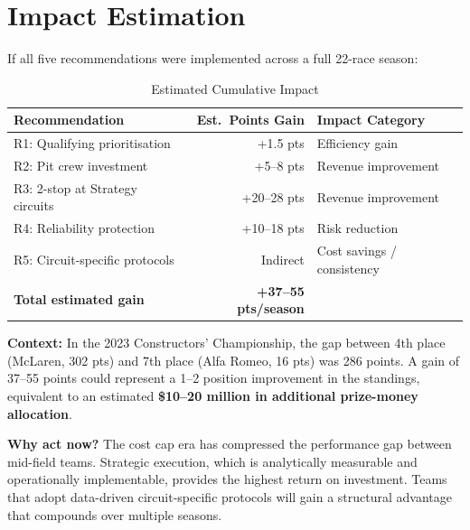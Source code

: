 \documentclass[12pt, a4paper]{article}
\begin{document}
\newpage

\section{Impact Estimation}

If all five recommendations were implemented across a full 22-race season:

\begin{table}[H]
\centering
\caption{Estimated Cumulative Impact}
\begin{tabular}{l r l}
\toprule
\textbf{Recommendation} & \textbf{Est.\ Points Gain} & \textbf{Impact Category} \\
\midrule
R1: Qualifying prioritisation    & +1.5 pts   & Efficiency gain \\
R2: Pit crew investment          & +5--8 pts  & Revenue improvement \\
R3: 2-stop at Strategy circuits  & +20--28 pts & Revenue improvement \\
R4: Reliability protection       & +10--18 pts & Risk reduction \\
R5: Circuit-specific protocols   & Indirect   & Cost savings / consistency \\
\midrule
\textbf{Total estimated gain}    & \textbf{+37--55 pts/season} & \\
\bottomrule
\end{tabular}
\end{table}

\textbf{Context:} In the 2023 Constructors' Championship, the gap between 4th place (McLaren, 302 pts) and 7th place (Alfa Romeo, 16 pts) was 286 points. A gain of 37--55 points could represent a 1--2 position improvement in the standings, equivalent to an estimated \textbf{\$10--20 million in additional prize-money allocation}.

\textbf{Why act now?} The cost cap era has compressed the performance gap between mid-field teams. Strategic execution, which is analytically measurable and operationally implementable, provides the highest return on investment. Teams that adopt data-driven circuit-specific protocols will gain a structural advantage that compounds over multiple seasons.

\newpage

\end{document}
